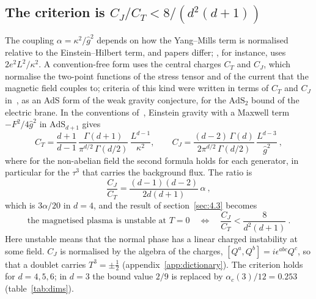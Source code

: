 \subsection{The criterion is \texorpdfstring{$C_J/C_T < 8/(d^2(d+1))$}{C\_J/C\_T < 8/(d\^{}2(d+1))}}
\label{sec:4.4}

The coupling $\alpha = \kappa^2/\hat g^2$ depends on how the Yang--Mills term
is normalised relative to the Einstein--Hilbert term, and papers differ;
\cite{Wong:2013rda}, for instance, uses $2e^2L^2/\kappa^2$. A
convention-free form uses the central charges $C_T$ and $C_J$, which
normalise the two-point functions of the stress tensor and of the current
that the magnetic field couples to; criteria of this kind were written in
terms of $C_T$ and $C_J$ in~\cite{Nakayama:2015hga}, as an AdS form of the
weak gravity conjecture, for the $\mathrm{AdS}_2$ bound of the electric
brane. In the conventions
of~\cite{Osborn:1993cr}, Einstein gravity with a Maxwell term
$-F^2/4\hat g^2$ in $\mathrm{AdS}_{d+1}$ gives~\cite{Buchel:2009sk,Freedman:1998tz}
\begin{equation}
C_T = \frac{d+1}{d-1}\,\frac{\Gamma(d+1)}{\pi^{d/2}\,\Gamma(d/2)}\,\frac{L^{d-1}}{\kappa^2}, \qquad
C_J = \frac{(d-2)\,\Gamma(d)}{2\pi^{d/2}\,\Gamma(d/2)}\,\frac{L^{d-3}}{\hat g^2}~,
\end{equation}
where for the non-abelian field the second formula holds for each
generator, in particular for the $\tau^3$ that carries the background flux.
The ratio is
\begin{equation}
\frac{C_J}{C_T} = \frac{(d-1)(d-2)}{2d(d+1)}\,\alpha~,
\end{equation}
which is $3\alpha/20$ in $d = 4$, and the result of section~\ref{sec:4.3}
becomes
\begin{equation}
\text{the magnetised plasma is unstable at } T = 0 \quad\Longleftrightarrow\quad \frac{C_J}{C_T} < \frac{8}{d^2(d+1)}~.
\end{equation}
Here unstable means that the normal phase has a linear charged
instability at some field. $C_J$ is normalised by the algebra of the charges, $[Q^a, Q^b] = i\epsilon^{abc}Q^c$, so
that a doublet carries $T^3 = \pm\frac12$ (appendix~\ref{app:dictionary}).
The criterion holds for $d = 4, 5, 6$; in $d = 3$ the bound value $2/9$ is replaced by
$\alpha_c(3)/12 = 0.253$ (table~\ref{tab:dims}).

